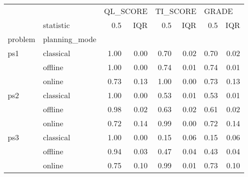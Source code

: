 \begin{tabular}{llrrrrrr}
\toprule
    & {} & \multicolumn{2}{l}{QL\_SCORE} & \multicolumn{2}{l}{TI\_SCORE} & \multicolumn{2}{l}{GRADE} \\
    & statistic &      0.5 &  IQR &      0.5 &  IQR &   0.5 &  IQR \\
problem & planning\_mode &          &      &          &      &       &      \\
\midrule
ps1 & classical &     1.00 & 0.00 &     0.70 & 0.02 &  0.70 & 0.02 \\
    & offline &     1.00 & 0.00 &     0.74 & 0.01 &  0.74 & 0.01 \\
    & online &     0.73 & 0.13 &     1.00 & 0.00 &  0.73 & 0.13 \\
ps2 & classical &     1.00 & 0.00 &     0.53 & 0.01 &  0.53 & 0.01 \\
    & offline &     0.98 & 0.02 &     0.63 & 0.02 &  0.61 & 0.02 \\
    & online &     0.72 & 0.14 &     0.99 & 0.00 &  0.72 & 0.14 \\
ps3 & classical &     1.00 & 0.00 &     0.15 & 0.06 &  0.15 & 0.06 \\
    & offline &     0.94 & 0.03 &     0.47 & 0.04 &  0.43 & 0.04 \\
    & online &     0.75 & 0.10 &     0.99 & 0.01 &  0.73 & 0.10 \\
\bottomrule
\end{tabular}
